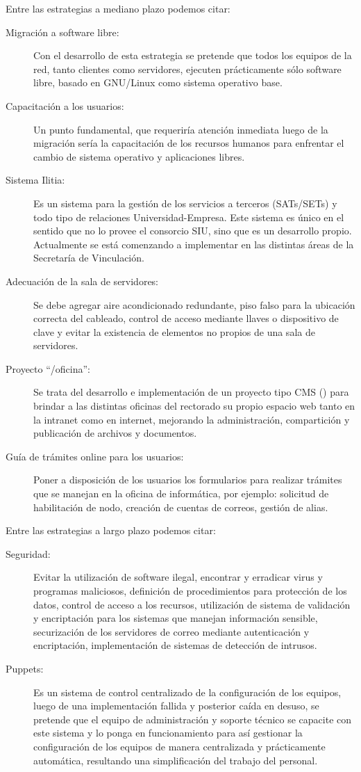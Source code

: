 \documentclass[a4paper,11pt,oneside]{article}
\begin{document}
Entre las estrategias a mediano plazo podemos citar:
%
\begin{description}
\item[Migración a software libre:] Con el desarrollo de esta
  estrategia se pretende que todos los equipos de la red, tanto
  clientes como servidores, ejecuten prácticamente sólo software
  libre, basado en GNU/Linux como sistema operativo base.
%
\item[Capacitación a los usuarios:]
Un punto fundamental, que requeriría atención inmediata luego de la
migración sería la capacitación de los recursos humanos para enfrentar
el cambio de sistema operativo y aplicaciones libres.
%
\item[Sistema Ilitia:]Es un sistema para la gestión de los servicios a
  terceros (SATs/SETs) y todo tipo de relaciones
  Universidad-Empresa. Este sistema es único en el sentido que no lo
  provee el consorcio SIU, sino que es un desarrollo propio. Actualmente
  se está comenzando a implementar en las distintas áreas de la
  Secretaría de Vinculación.
%
\item[Adecuación de la sala de servidores:] Se debe agregar aire
  acondicionado redundante, piso falso para la ubicación correcta del
  cableado, control de acceso mediante llaves o dispositivo de clave y
  evitar la existencia de elementos no propios de una sala de
  servidores.
%
\item[Proyecto ``/oficina'':] Se trata del desarrollo e implementación
  de un proyecto tipo CMS () para
  brindar a las distintas oficinas del rectorado su propio espacio web
  tanto en la intranet como en internet, mejorando la administración,
  compartición y publicación de archivos y documentos.
\item [Guía de trámites online para los usuarios:]Poner a disposición
  de los usuarios los formularios para realizar trámites que se
  manejan en la oficina de informática, por ejemplo: solicitud de
  habilitación de nodo, creación de cuentas de correos, gestión de
  alias.
\end{description}

Entre las estrategias a largo plazo podemos citar:
%
\begin{description}
\item[Seguridad:]Evitar la utilización de software ilegal, encontrar y
  erradicar virus y programas maliciosos, definición de procedimientos
  para protección de los datos, control de acceso a los recursos,
  utilización de sistema de validación y encriptación para los
  sistemas que manejan información sensible, securización de los
  servidores de correo mediante autenticación y encriptación,
  implementación de sistemas de detección de intrusos.
\item[Puppets:]Es un sistema de control centralizado de la
  configuración de los equipos, luego de una implementación fallida y
  posterior caída en desuso, se pretende que el equipo de
  administración y soporte técnico se capacite con este sistema y lo
  ponga en funcionamiento para así gestionar la configuración de los
  equipos de manera centralizada y prácticamente automática,
  resultando una simplificación del trabajo del personal.
\end{description}
%
\end{document}
